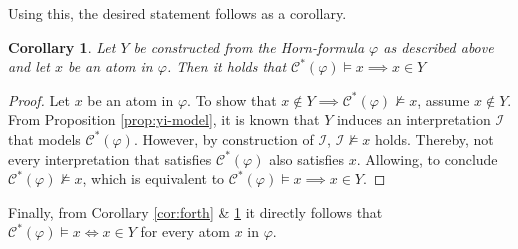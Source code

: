 \documentclass [11pt]{article}
\newtheorem{corollary}[theorem]{Corollary}
\newcommand{\nmodels}{\not\models}
\begin{document}
Using this, the desired statement follows as a corollary. 

\begin{corollary} 
\label{cor:back}
Let $Y$ be constructed from the Horn-formula $\varphi$ as described above and let $x$ be an atom in $\varphi$.  Then it holds that  $\mathcal{C}^*(\varphi) \models x  \implies x \in Y$
\end{corollary}
\begin{proof}
Let $x$ be an atom in $\varphi$. To show that $x \notin Y \implies \mathcal{C}^*(\varphi) \nmodels x$, assume $x \notin Y$. 
From Proposition \ref{prop:yi-model}, it is known that $Y$ induces an interpretation $\mathcal{I}$ that models  $ \mathcal{C}^*(\varphi)$.
However, by construction of $\mathcal{I}$, $\mathcal{I}\nmodels x$ holds.  Thereby, not every interpretation that satisfies $ \mathcal{C}^*(\varphi)$
also satisfies $x$. Allowing, to conclude $\mathcal{C}^*(\varphi) \nmodels x$, which is equivalent to $\mathcal{C}^*(\varphi) \models x  \implies x \in Y$.
\end{proof}

Finally, from Corollary  \ref{cor:forth} \& \ref{cor:back} it directly follows that  $\mathcal{C}^*(\varphi) \models x  \iff x \in Y$ for every atom $x$ in $\varphi$.
\end{document}
